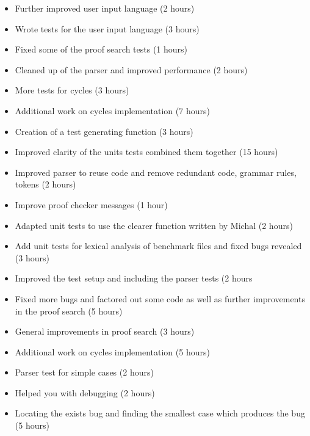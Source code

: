 %
{ \begin{itemize} 
 \item Further improved user input language (2 hours)
 \item Wrote tests for the user input language (3 hours)
 \item Fixed some of the proof search tests (1 hours)
 \item Cleaned up of the parser and improved performance (2 hours)
 \end{itemize} 
}%
{ \begin{itemize} 
 \item More tests for cycles (3 hours)
 \item Additional work on cycles implementation (7 hours)
 \end{itemize} 
}%
{ \begin{itemize} 
\item Creation of a test generating function (3 hours)
\item Improved clarity of the units tests combined them together (15 hours)
 \end{itemize} 
}%
{ \begin{itemize} 
  \item Improved parser to reuse code and remove redundant code, grammar rules, tokens (2 hours)
  \item Improve proof checker messages (1 hour)
  \item Adapted unit tests to use the clearer function written by Michal (2 hours)
  \item Add unit tests for lexical analysis of benchmark files and fixed bugs revealed (3 hours)
 \end{itemize} 
}%

%
{ \begin{itemize} 
 \item Improved the test setup and including the parser tests (2 hours
 \item Fixed more bugs and factored out some code as well as further improvements in
the proof search (5 hours)
 \end{itemize} 
}%
{ \begin{itemize} 
 \item General improvements in proof search (3 hours)
 \item Additional work on cycles implementation (5 hours)
 \end{itemize} 
}%
{ \begin{itemize} 
\item Parser test for simple cases (2 hours)
\item Helped you with debugging (2 hours)
 \end{itemize} 
}%
{ \begin{itemize} 
 \item Locating the exists bug and finding the smallest case which produces the bug (5 hours)
 \end{itemize} 
}%

